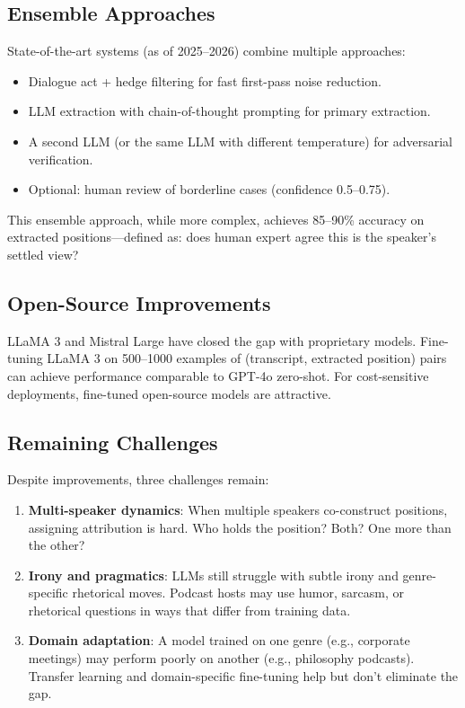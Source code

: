 \documentclass[11pt,letterpaper]{article}
\begin{document}
\subsection{Ensemble Approaches}

State-of-the-art systems (as of 2025–2026) combine multiple approaches:
\begin{itemize}
  \item Dialogue act + hedge filtering for fast first-pass noise reduction.
  \item LLM extraction with chain-of-thought prompting for primary extraction.
  \item A second LLM (or the same LLM with different temperature) for adversarial verification.
  \item Optional: human review of borderline cases (confidence 0.5–0.75).
\end{itemize}

This ensemble approach, while more complex, achieves 85–90\% accuracy on extracted positions—defined as: does human expert agree this is the speaker's settled view?

\subsection{Open-Source Improvements}

LLaMA 3 and Mistral Large have closed the gap with proprietary models. Fine-tuning LLaMA 3 on 500–1000 examples of (transcript, extracted position) pairs can achieve performance comparable to GPT-4o zero-shot. For cost-sensitive deployments, fine-tuned open-source models are attractive.

\subsection{Remaining Challenges}

Despite improvements, three challenges remain:

\begin{enumerate}
  \item \textbf{Multi-speaker dynamics}: When multiple speakers co-construct positions, assigning attribution is hard. Who holds the position? Both? One more than the other?
  \item \textbf{Irony and pragmatics}: LLMs still struggle with subtle irony and genre-specific rhetorical moves. Podcast hosts may use humor, sarcasm, or rhetorical questions in ways that differ from training data.
  \item \textbf{Domain adaptation}: A model trained on one genre (e.g., corporate meetings) may perform poorly on another (e.g., philosophy podcasts). Transfer learning and domain-specific fine-tuning help but don't eliminate the gap.
\end{enumerate}
\end{document}
